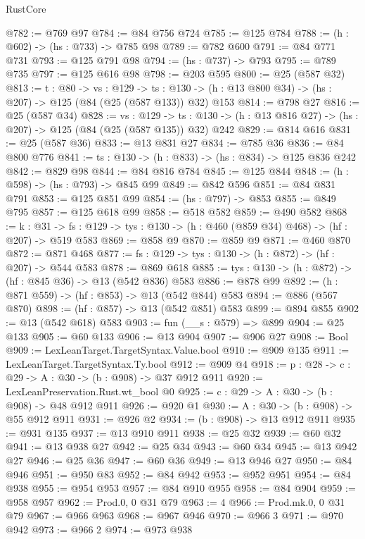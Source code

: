 \begin{lexlean}{RustCore}
\begin{coremodule}
@782 := @769 @97
@784 := @84 @756 @724
@785 := @125 @784
@788 := (h : @602) -> (hs : @733) -> @785 @98
@789 := @782 @600
@791 := @84 @771 @731
@793 := @125 @791 @98
@794 := (hs : @737) -> @793
@795 := @789 @735
@797 := @125 @616 @98
@798 := @203 @595
@800 := @25 (@587 @32)
@813 := {t : @80} ->
  {vs : @129} ->
  {ts : @130} -> (h : @13 @800 @34) -> (hs : @207) -> @125 (@84 (@25 (@587 @133)) @32) @153
@814 := @798 @27
@816 := @25 (@587 @34)
@828 := {vs : @129} ->
  {ts : @130} -> (h : @13 @816 @27) -> (hs : @207) -> @125 (@84 (@25 (@587 @135)) @32) @242
@829 := @814 @616
@831 := @25 (@587 @36)
@833 := @13 @831 @27
@834 := @785 @36
@836 := @84 @800 @776
@841 := {ts : @130} -> (h : @833) -> (hs : @834) -> @125 @836 @242
@842 := @829 @98
@844 := @84 @816 @784
@845 := @125 @844
@848 := (h : @598) -> (hs : @793) -> @845 @99
@849 := @842 @596
@851 := @84 @831 @791
@853 := @125 @851 @99
@854 := (hs : @797) -> @853
@855 := @849 @795
@857 := @125 @618 @99
@858 := @518 @582
@859 := @490 @582
@868 := {k : @31} ->
  {fs : @129} -> {tys : @130} -> (h : @460 (@859 @34) @468) -> (hf : @207) -> @519 @583
@869 := @858 @9
@870 := @859 @9
@871 := @460 @870
@872 := @871 @468
@877 := {fs : @129} -> {tys : @130} -> (h : @872) -> (hf : @207) -> @544 @583
@878 := @869 @618
@885 := {tys : @130} -> (h : @872) -> (hf : @845 @36) -> @13 (@542 @836) @583
@886 := @878 @99
@892 := (h : @871 @559) -> (hf : @853) -> @13 (@542 @844) @583
@894 := @886 (@567 @870)
@898 := (hf : @857) -> @13 (@542 @851) @583
@899 := @894 @855
@902 := @13 (@542 @618) @583
@903 := fun (__s : @579) => @899
@904 := @25 @133
@905 := @60 @133
@906 := @13 @904
@907 := @906 @27
@908 := Bool
@909 := LexLeanTarget.TargetSyntax.Value.bool
@910 := @909 @135
@911 := LexLeanTarget.TargetSyntax.Ty.bool
@912 := @909 @4
@918 := {p : @28} -> {c : @29} -> {A : @30} -> (b : @908) -> @37 @912 @911
@920 := LexLeanPreservation.Rust.wt_bool @0
@925 := {c : @29} -> {A : @30} -> (b : @908) -> @48 @912 @911
@926 := @920 @1
@930 := {A : @30} -> (b : @908) -> @55 @912 @911
@931 := @926 @2
@934 := (b : @908) -> @13 @912 @911
@935 := @931 @135
@937 := @13 @910 @911
@938 := @25 @32
@939 := @60 @32
@941 := @13 @938 @27
@942 := @25 @34
@943 := @60 @34
@945 := @13 @942 @27
@946 := @25 @36
@947 := @60 @36
@949 := @13 @946 @27
@950 := @84 @946
@951 := @950 @83
@952 := @84 @942
@953 := @952 @951
@954 := @84 @938
@955 := @954 @953
@957 := @84 @910 @955
@958 := @84 @904
@959 := @958 @957
@962 := Prod.{0, 0} @31 @79
@963 := 4
@966 := Prod.mk.{0, 0} @31 @79
@967 := @966 @963
@968 := @967 @946
@970 := @966 3
@971 := @970 @942
@973 := @966 2
@974 := @973 @938

\end{coremodule}
\end{lexlean}
